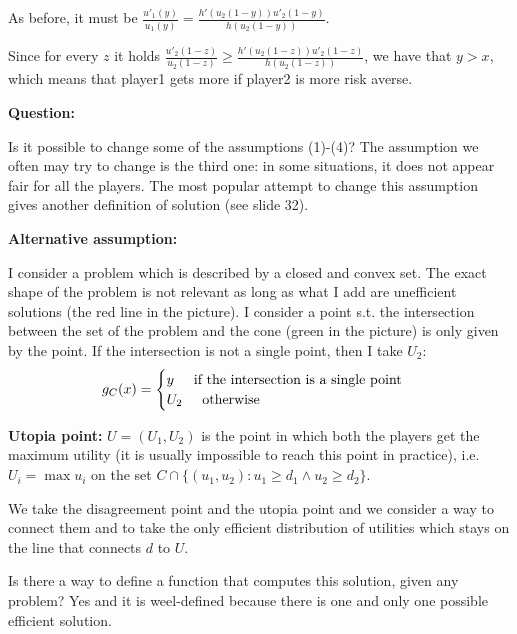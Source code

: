 \noindent As before, it must be $\frac{u'_1(y)}{u_1(y)} = \frac{h'(u_2(1-y))u'_2(1-y)}{h(u_2(1-y))}$.

\noindent Since for every $z$ it holds $\frac{u'_2(1-z)}{u_2(1-z)} \geq \frac{h'(u_2(1-z))u'_2(1-z)}{h(u_2(1-z))}$, we have that $y > x$, which means that player1 gets more if player2 is more risk averse.

\bigskip
\noindent \textbf{Question:}

\noindent Is it possible to change some of the assumptions (1)-(4)? The assumption 
we often may try to change is the third one: in some situations, it does not 
appear fair for all the players. The most popular attempt to change this 
assumption gives another definition of solution (see slide 32).

\bigskip
\noindent \textbf{Alternative assumption:}

\noindent I consider a problem which is described by a closed and convex set. 
The exact shape of the problem is not relevant as long as what I add are 
unefficient solutions (the red line in the picture). I consider a point s.t. 
the intersection between the set of the problem and the cone (green in the 
picture) is only given by the point. If the intersection is not a single point, 
then I take $U_2$:
\begin{equation*}
	g_C(x) = \begin{cases}
	y \hspace{.5cm} \text{if the intersection is a single point}\\
	U_2 \hspace{.5cm} \text{otherwise} 
	\end{cases}
\end{equation*}

\bigskip
\noindent \textbf{Utopia point:} $U = (U_1,U_2)$ is the point in which both the players get 
the maximum utility (it is usually impossible to reach this point in practice), i.e. $U_i = \max u_i$ on the set $C \cap \{(u_1,u_2): u_1 \geq d_1 \wedge u_2 \geq d_2\}$.

\bigskip
\noindent We take the disagreement point and the utopia point and we consider 
a way to connect them and to take the only efficient distribution of utilities 
which stays on the line that connects $d$ to $U$.

\noindent Is there a way to define a function that computes this solution, 
given any problem? Yes and it is weel-defined because there is one and only 
one possible efficient solution.

